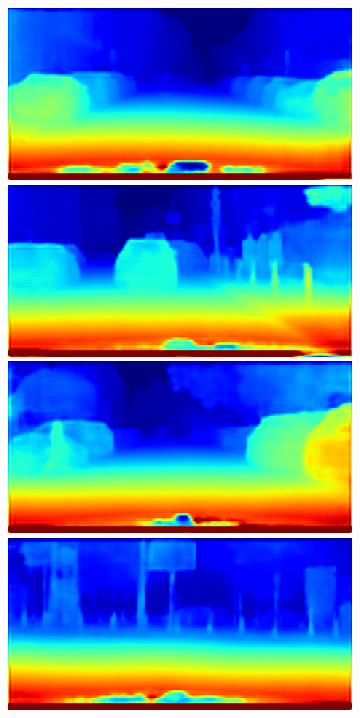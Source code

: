 \begin{figure}[p]
{{\begin{subfigure}[t]{0.24\linewidth}
\begin{center}
		\includegraphics[width=\linewidth,trim={0px 60px 0 0px},clip]{results/segnet_86_output_4.png}
		\includegraphics[width=\linewidth,trim={0px 60px 0 0px},clip]{results/segnet_51_output_4.png}
		\includegraphics[width=\linewidth,trim={0px 60px 0 0px},clip]{results/segnet_45_output_4.png}
		\includegraphics[width=\linewidth,trim={0px 60px 0 0px},clip]{results/segnet_19_output_4.png}

\end{center}
\end{subfigure}}}
\end{figure}
